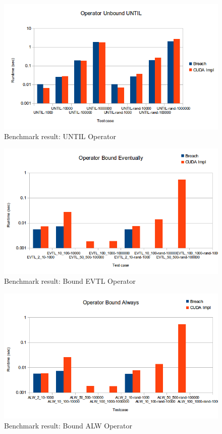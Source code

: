 \documentclass[a4paper,10pt]{article}
\begin{document}
\begin{figure}[H]
    \includegraphics[scale=0.5]{bm_until.png}
    \caption{
        \label{fig:bm_until}
        Benchmark result: UNTIL Operator}
\end{figure}

\begin{figure}[H]
    \includegraphics[scale=0.5]{bm_bevtl.png}
    \caption{
        \label{fig:bm_bevtl}
        Benchmark result: Bound EVTL Operator}
\end{figure}

\begin{figure}[H]
    \includegraphics[scale=0.5]{bm_balw.png}
    \caption{
        \label{fig:bm_balw}
        Benchmark result: Bound ALW Operator}
\end{figure}
\end{document}
